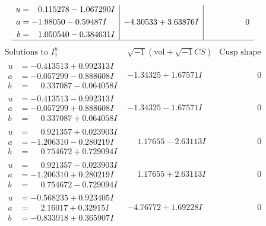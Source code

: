 \documentclass[1p]{elsarticle_modified}
\theoremstyle{definition}
\newcommand{\I}{\sqrt{-1}}
\begin{document}
$$\begin{array}{c|c|c}
\begin{aligned}
u &= \phantom{-}0.115278 - 1.067290 I \\
a &= -1.98050 - 0.59487 I \\
b &= \phantom{-}1.050540 - 0.384631 I\end{aligned}
 & -4.30533 + 3.63876 I & \phantom{-0.000000 } 0\\
 \hline 
 \end{array}$$\newpage$$\begin{array}{c|c|c}  
\text{Solutions to }I^u_{1}& \I (\text{vol} + \sqrt{-1}CS) & \text{Cusp shape}\\
 \hline 
\begin{aligned}
u &= -0.413513 + 0.992313 I \\
a &= -0.057299 - 0.888608 I \\
b &= \phantom{-}0.337087 - 0.064058 I\end{aligned}
 & -1.34325 + 1.67571 I & \phantom{-0.000000 } 0 \\ \hline\begin{aligned}
u &= -0.413513 - 0.992313 I \\
a &= -0.057299 + 0.888608 I \\
b &= \phantom{-}0.337087 + 0.064058 I\end{aligned}
 & -1.34325 - 1.67571 I & \phantom{-0.000000 } 0 \\ \hline\begin{aligned}
u &= \phantom{-}0.921357 + 0.023903 I \\
a &= -1.206310 - 0.280219 I \\
b &= \phantom{-}0.754672 + 0.729094 I\end{aligned}
 & \phantom{-}1.17655 - 2.63113 I & \phantom{-0.000000 } 0 \\ \hline\begin{aligned}
u &= \phantom{-}0.921357 - 0.023903 I \\
a &= -1.206310 + 0.280219 I \\
b &= \phantom{-}0.754672 - 0.729094 I\end{aligned}
 & \phantom{-}1.17655 + 2.63113 I & \phantom{-0.000000 } 0 \\ \hline\begin{aligned}
u &= -0.568235 + 0.923405 I \\
a &= \phantom{-}2.16017 + 0.32915 I \\
b &= -0.833918 + 0.365907 I\end{aligned}
 & -4.76772 + 1.69228 I & \phantom{-0.000000 } 0 \\ \hline\begin{aligned}

\end{aligned}
\end{array}$$
\end{document}
